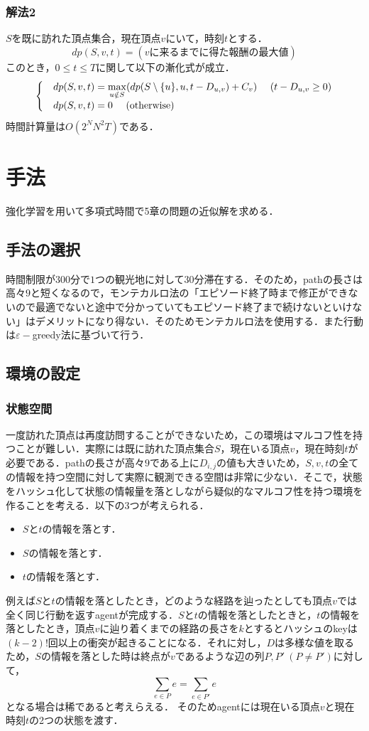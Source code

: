 \documentclass[a4paper,12pt]{jsreport}
\theoremstyle{definition}
\begin{document}
\subsection{解法2}
$S$を既に訪れた頂点集合，現在頂点$v$にいて，時刻$t$とする．
$$dp(S,v,t)=(vに来るまでに得た報酬の最大値)$$
このとき，$0\leq t\leq T$に関して以下の漸化式が成立．
\begin{eqnarray}
    \begin{cases}
        & \displaystyle dp(S,v,t)=\max_{u \notin S}(dp(S\setminus\{u\},u,t-D_{u,v})+C_v)\ \ \ \  (t-D_{u,v}\geq0)\\
        & dp(S,v,t)=0 \ \ \ \ ({\rm otherwise})
    \end{cases} 
\end{eqnarray}
時間計算量は$O(2^NN^2T)$である．

\chapter{手法}
強化学習を用いて多項式時間で5章の問題の近似解を求める．
\section{手法の選択}
時間制限が$300$分で$1$つの観光地に対して$30$分滞在する．そのため，pathの長さは高々$9$と短くなるので，モンテカルロ法の「エピソード終了時まで修正ができないので最適でないと途中で分かっていてもエピソード終了まで続けないといけない」はデメリットになり得ない．そのためモンテカルロ法を使用する．また行動は$\varepsilon-$greedy法に基づいて行う．
\section{環境の設定}
\subsection{状態空間}
一度訪れた頂点は再度訪問することができないため，この環境はマルコフ性を持つことが難しい．実際には既に訪れた頂点集合$S$，現在いる頂点$v$，現在時刻$t$が必要である．pathの長さが高々$9$である上に$D_{i,j}$の値も大きいため，$S,v,t$の全ての情報を持つ空間に対して実際に観測できる空間は非常に少ない．そこで，状態をハッシュ化して状態の情報量を落としながら疑似的なマルコフ性を持つ環境を作ることを考える．以下の3つが考えられる．
\begin{itemize}
  \item $S$と$t$の情報を落とす．
  \item $S$の情報を落とす．
  \item $t$の情報を落とす．
\end{itemize}
例えば$S$と$t$の情報を落としたとき，どのような経路を辿ったとしても頂点$v$では全く同じ行動を返すagentが完成する．$S$と$t$の情報を落としたときと，$t$の情報を落としたとき，頂点$v$に辿り着くまでの経路の長さを$k$とするとハッシュのkeyは$(k-2)!$回以上の衝突が起きることになる．それに対し，$D$は多様な値を取るため，$S$の情報を落とした時は終点が$v$であるような辺の列$P,P'\ (P\not=P')$に対して，
\begin{equation}
    \sum_{e \in P} e= \sum_{e \in P'} e
\end{equation}
となる場合は稀であると考えらえる．
そのためagentには現在いる頂点$v$と現在時刻$t$の2つの状態を渡す．
\end{document}
